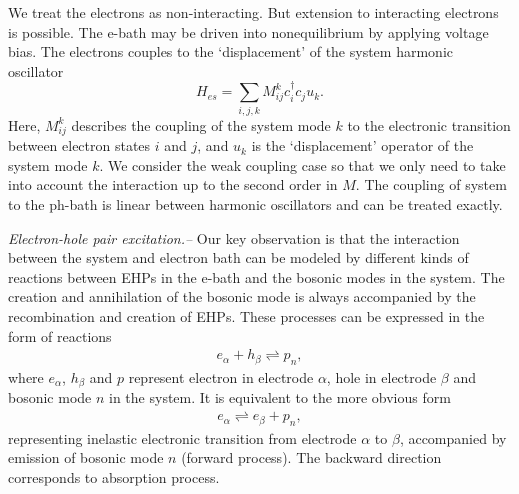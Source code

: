 \documentclass[aps
,twocolumn
,floatfix,footinbib,prl
]{revtex4-1}
\begin{document}
We treat the electrons as non-interacting. But extension to interacting electrons is possible\cite{dou_born-oppenheimer_2017}. The e-bath may be driven into nonequilibrium by applying voltage bias. The electrons couples to the `displacement' of the system harmonic oscillator
\begin{equation}
H_{es} = \sum_{i,j,k} M^{k}_{ij}c^\dagger_i c_j u_k.
\label{eq:eboson}
\end{equation}
Here, $M^k_{ij}$ describes the coupling of the system mode $k$ to the electronic transition between electron states $i$ and $j$, and $u_k$ is the `displacement' operator of the system mode $k$. We consider the weak coupling case so that we only need to take into account the interaction up to the second order in $M$. The coupling of system to the ph-bath is linear between harmonic oscillators and can be treated exactly.





\emph{ Electron-hole pair excitation.--}
Our key observation is that the interaction between the system and electron bath can be modeled by different kinds of reactions between EHPs in the e-bath and the bosonic modes in the system. The creation and annihilation of the bosonic mode is always accompanied by the recombination and creation of EHPs. These processes can be expressed in the form of reactions
\begin{align}
e_\alpha + h_\beta \rightleftharpoons p_n,
\label{eq:reaction}
\end{align}
where $e_\alpha$, $h_\beta$ and $p$ represent electron in electrode $\alpha$, hole in electrode $\beta$ and bosonic mode $n$ in the system. It is equivalent to the more obvious form
\begin{align}
e_\alpha \rightleftharpoons e_\beta + p_n,
\label{eq:reaction2}
\end{align}
representing inelastic electronic transition from electrode $\alpha$ to $\beta$, accompanied by emission of bosonic mode $n$ (forward process). The backward direction corresponds to absorption process.
\end{document}
